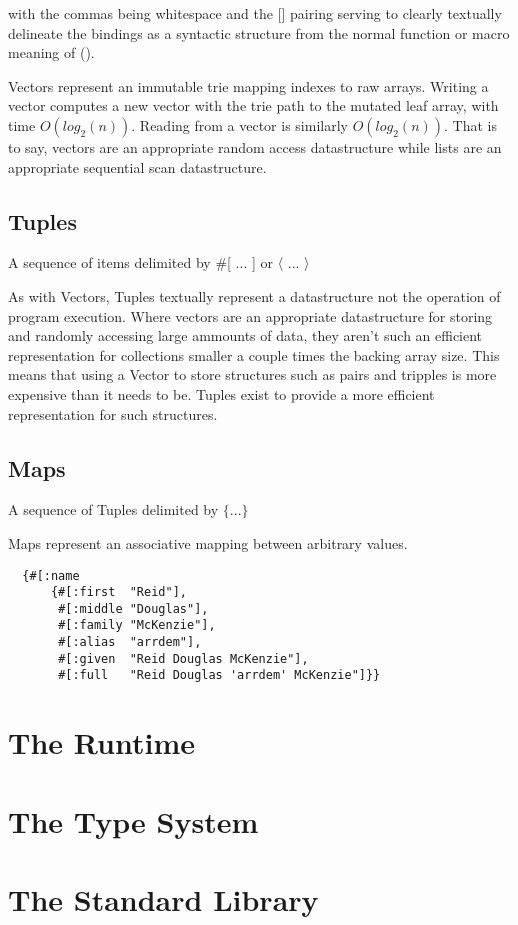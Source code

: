 \documentclass{report}
\begin{document}
with the commas being whitespace and the [] pairing serving to clearly
textually delineate the bindings as a syntactic structure from the normal
function or macro meaning of ().

Vectors represent an immutable trie mapping indexes to raw arrays. Writing a
vector computes a new vector with the trie path to the mutated leaf array,
with time $O(log_2(n))$. Reading from a vector is similarly
$O(log_2(n))$. That is to say, vectors are an appropriate random access
datastructure while lists are an appropriate sequential scan datastructure.

\section{Tuples}


A sequence of items delimited by \#[ ... ] or 〈 ... 〉

As with Vectors, Tuples textually represent a datastructure not the operation
of program execution. Where vectors are an appropriate datastructure for
storing and randomly accessing large ammounts of data, they aren't such an
efficient representation for collections smaller a couple times the backing
array size. This means that using a Vector to store structures such as pairs
and tripples is more expensive than it needs to be. Tuples exist to provide a
more efficient representation for such structures.

\section{Maps}


A sequence of Tuples delimited by $\{ ... \}$

Maps represent an associative mapping between arbitrary values.

\begin{lstlisting}
  {#[:name
      {#[:first  "Reid"],
       #[:middle "Douglas"],
       #[:family "McKenzie"],
       #[:alias  "arrdem"],
       #[:given  "Reid Douglas McKenzie"],
       #[:full   "Reid Douglas 'arrdem' McKenzie"]}}
\end{lstlisting}

\chapter{The Runtime}


\chapter{The Type System}


\chapter{The Standard Library}

\end{document}
